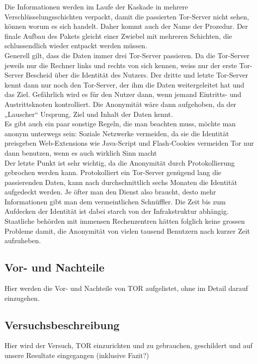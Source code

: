 Die Informationen werden im Laufe der Kaskade in mehrere Verschlüsselungsschichten verpackt, damit die passierten Tor-Server nicht sehen, können worum es sich handelt. Daher kommt auch der Name der Prozedur. Der finale Aufbau des Pakets gleicht einer Zwiebel mit mehreren Schichten, die  schlussendlich wieder entpackt werden müssen.
\\
Generell gilt, dass die Daten immer drei Tor-Server passieren. Da die Tor-Server jeweils nur die Rechner links und rechts von sich kennen, weiss nur der erste Tor-Server Bescheid über die Identität des Nutzers. Der dritte und letzte Tor-Server kennt dann nur noch den Tor-Server, der ihm die Daten weitergeleitet hat und das Ziel. Gefährlich wird es für den Nutzer dann, wenn jemand Eintritts- und Austrittsknoten kontrolliert. Die Anonymität wäre dann aufgehoben, da der „Lauscher“ Ursprung, Ziel und Inhalt der Daten kennt.
\\
Es gibt auch ein paar sonstige Regeln, die man beachten muss, möchte man anonym unterwegs sein:
Soziale Netzwerke vermeiden, da sie die Identität preisgeben
Web-Extensions wie Java-Script und Flash-Cookies vermeiden
Tor nur dann benutzen, wenn es auch wirklich Sinn macht
\\
Der letzte Punkt ist sehr wichtig, da die Anonymität durch Protokollierung gebrochen werden kann. Protokolliert ein Tor-Server genügend lang die passierenden Daten, kann nach durchschnittlich sechs Monaten die Identität aufgedeckt werden. Je öfter man den Dienst also braucht, desto mehr Informationen gibt man dem vermeintlichen Schnüffler. Die Zeit bis zum Aufdecken der Identität ist dabei starch von der Infrakstruktur abhängig. Staatliche behörden mit immensen Rechenzentren hätten folglich keine grossen Probleme damit, die Anonymität von vielen tausend Benutzern nach kurzer Zeit aufzuheben.

\subsection{Vor- und Nachteile}
Hier werden die Vor- und Nachteile von TOR aufgelistet, ohne im Detail darauf einzugehen.

\subsection{Versuchsbeschreibung}
Hier wird der Versuch, TOR einzurichten und zu gebrauchen, geschildert und auf unsere Resultate eingegangen (inklusive Fazit?)

